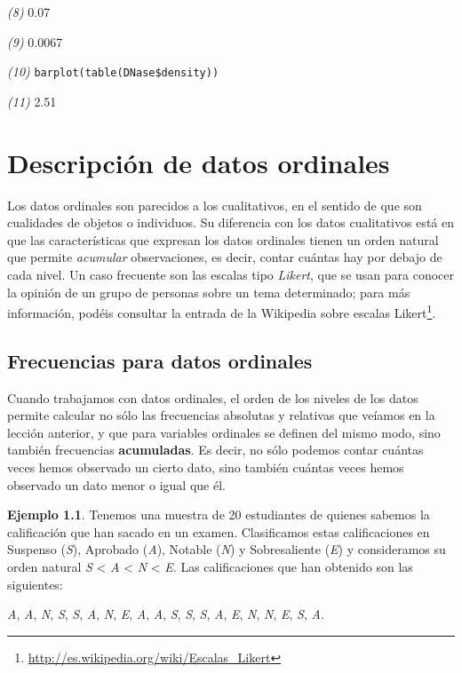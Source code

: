 \documentclass[
]{book}
\DeclareRobustCommand{\href}[2]{#2\footnote{\url{#1}}}
\theoremstyle{definition}
\theoremstyle{definition}
\newtheorem{example}{Ejemplo}[chapter]
\theoremstyle{definition}
\theoremstyle{remark}
\begin{document}
\emph{(8)} 0.07

\emph{(9)} 0.0067

\emph{(10)} \texttt{barplot(table(DNase\$density))}

\emph{(11)} 2.51

\hypertarget{chap:ord}{%
\chapter{Descripción de datos ordinales}\label{chap:ord}}

Los datos ordinales son parecidos a los cualitativos, en el sentido de que son cualidades de objetos o individuos. Su diferencia con los datos cualitativos está en que las características que expresan los datos ordinales tienen un orden natural que permite \emph{acumular} observaciones, es decir, contar cuántas hay por debajo de cada nivel. Un caso frecuente son las escalas tipo \emph{Likert}, que se usan para conocer la opinión de un grupo de personas sobre un tema determinado; para más información, podéis consultar \href{http://es.wikipedia.org/wiki/Escalas_Likert}{la entrada de la Wikipedia sobre escalas Likert}.

\hypertarget{frecuencias-para-datos-ordinales}{%
\section{Frecuencias para datos ordinales}\label{frecuencias-para-datos-ordinales}}

Cuando trabajamos con datos ordinales, el orden de los niveles de los datos permite calcular no sólo las frecuencias absolutas y relativas que veíamos en la lección anterior, y que para variables ordinales se definen del mismo modo, sino también frecuencias \textbf{acumuladas}. Es decir, no sólo podemos contar cuántas veces hemos observado un cierto dato, sino también cuántas veces hemos observado un dato menor o igual que él.

\begin{example}
\protect\hypertarget{exm:ex1701bis}{}{\label{exm:ex1701bis} }Tenemos una muestra de 20 estudiantes de quienes sabemos la calificación que han sacado en un examen. Clasificamos estas calificaciones en Suspenso (\emph{S}), Aprobado (\emph{A}), Notable (\emph{N}) y Sobresaliente (\emph{E}) y consideramos su orden natural \emph{S} \textless{} \emph{A} \textless{} \emph{N} \textless{} \emph{E}. Las calificaciones que han obtenido son las siguientes:

\emph{A}, \emph{A}, \emph{N}, \emph{S}, \emph{S}, \emph{A}, \emph{N}, \emph{E}, \emph{A}, \emph{A}, \emph{S}, \emph{S}, \emph{S}, \emph{A}, \emph{E}, \emph{N}, \emph{N}, \emph{E}, \emph{S}, \emph{A}.
\end{example}
\end{document}
